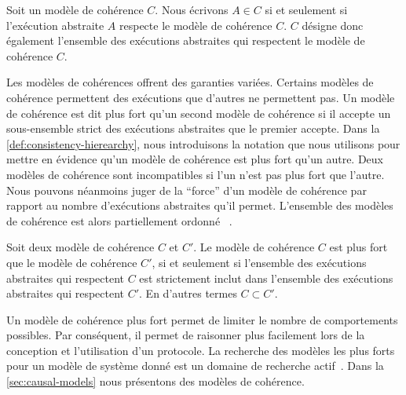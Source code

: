\begin{definition}\label{def:consistency-model}
Soit un modèle de cohérence $C$.
Nous écrivons $A \in C$ si et seulement si l'exécution abstraite $A$ respecte le modèle de cohérence $C$.
$C$ désigne donc également l'ensemble des exécutions abstraites qui respectent le modèle de cohérence $C$.
\end{definition}


Les modèles de cohérences offrent des garanties variées.
Certains modèles de cohérence permettent des exécutions que d'autres ne permettent pas.
Un modèle de cohérence est dit plus fort qu'un second modèle de cohérence si il accepte un sous-ensemble strict des exécutions abstraites que le premier accepte.
Dans la \autoref{def:consistency-hierearchy}, nous introduisons la notation que nous utilisons pour mettre en évidence qu'un modèle de cohérence est plus fort qu'un autre.
Deux modèles de cohérence sont incompatibles si l'un n'est pas plus fort que l'autre.
Nous pouvons néanmoins juger de la \enquote{force} d'un modèle de cohérence par rapport au nombre d'exécutions abstraites qu'il permet.
L'ensemble des modèles de cohérence est alors partiellement ordonné
~\autocite{viotti_consistency_2016}.

\begin{definition}\label{def:consistency-hierearchy}
Soit deux modèle de cohérence $C$ et $C'$.
Le modèle de cohérence $C$ est plus fort que le modèle de cohérence $C'$, si et seulement si l'ensemble des exécutions abstraites qui respectent $C$ est strictement inclut dans l'ensemble des exécutions abstraites qui respectent $C'$.
En d'autres termes $C \subset C'$.
\end{definition}

Un modèle de cohérence plus fort permet de limiter le nombre de comportements possibles.
Par conséquent, il permet de raisonner plus facilement lors de la conception et l'utilisation d'un protocole.
La recherche des modèles les plus forts pour un modèle de système donné est un domaine de recherche actif~\cite{mahajan_2011_cac,guerraoui_2016_tradeoffs-replication,viotti_consistency_2016}.
Dans la \autoref{sec:causal-models} nous présentons des modèles de cohérence.


